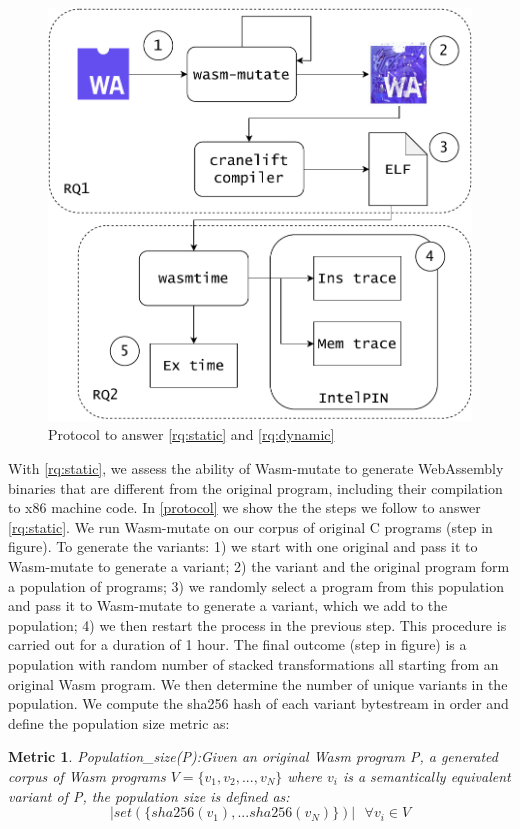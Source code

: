 \documentclass[sigplan,screen]{acmart}
\newcommand{\tool}{Wasm-mutate\xspace}
\newcommand{\wasm}{Wasm\xspace}
\newcommand{\Wasm}{WebAssembly\xspace}
\newtheorem{metric}{Metric}
\newcommand*\step[1]{
\noindent\tikz[baseline=(char.base)]{
        \node[shape=circle,text=black,draw=black, fill=white,inner sep=1.2pt] (char) {#1};}}
\begin{document}
\begin{figure}
    \centering
    \includegraphics[width=0.8\linewidth]{figures/protocol.pdf}
    \caption{Protocol to answer \ref{rq:static} and \ref{rq:dynamic}}
  \label{protocol}
\end{figure}


With \ref{rq:static},
we assess the ability of \tool to generate \Wasm binaries that are different from the original program, including their compilation to x86 machine code.
In \autoref{protocol} we show the the steps we follow to answer \ref{rq:static}.
We run \tool on our corpus of \nProgramsRosetta{} original C programs (step \step{1} in figure). 
To generate the variants:
1) we start with one original and pass it to \tool to generate a variant;  
2) the variant and the original program form a population of programs; 
3) we randomly select a program from this population and pass it to \tool to generate a variant, which we add to the population; 
4) we then restart the process in the previous step. 
This procedure is carried out for a duration of 1 hour.
The final outcome (step \step{2} in figure) is a population with random number of stacked transformations all starting from an original \wasm program.
We then determine the number of unique variants in the population.
We compute the sha256 hash of each variant bytestream in order and define the population size metric as: 


\begin{metric}{Population\_size(P):}\label{metric:pop}
Given an original \wasm program P, a generated corpus of \wasm programs $V=\{v_1, v_2, ..., v_N\}$ where $v_i$ is a semantically equivalent variant of P, the population size is defined as:
$$
    | set(\{ sha256(v_1), ... sha256(v_N) \})|\text{ }\forall v_i \in V 
$$
\end{metric}
\end{document}
